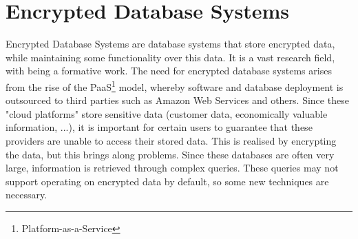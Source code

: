 \section{Encrypted Database Systems}
Encrypted Database Systems are database systems that store encrypted data, while maintaining some functionality over this data. It is a vast research field, with \citet{sok-cryptdb} being a formative work. The need for encrypted database systems arises from the rise of the PaaS\footnote{Platform-as-a-Service} model, whereby software and database deployment is outsourced to third parties such as Amazon Web Services and others. Since these "cloud platforms" store sensitive data (customer data, economically valuable information, ...), it is important for certain users to guarantee that these providers are unable to access their stored data. This is realised by encrypting the data, but this brings along problems. Since these databases are often very large, information is retrieved through complex queries. These queries may not support operating on encrypted data by default, so some new techniques are necessary.


